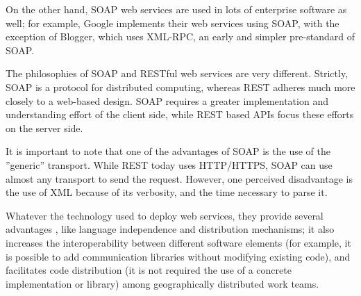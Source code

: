 \documentclass[final,1p,times]{elsarticle}
\begin{document}
On the other hand, SOAP web services are used in lots of enterprise software as well; for example, Google implements their web services using SOAP, with the exception of Blogger, which uses XML-RPC, an early and simpler pre-standard of SOAP. 

The philosophies of SOAP and RESTful web services are very different. Strictly, SOAP is a protocol for distributed computing, whereas REST adheres much more closely to a web-based design. 
SOAP requires a greater implementation and understanding effort of the client side, while REST based APIs focus these efforts on the server side. 


It is important to note that one of the advantages of SOAP is the use of the ''generic'' transport. While REST today uses HTTP/HTTPS, SOAP can use almost any transport to send the request. 
However, one perceived disadvantage is the use of XML \cite{LearningXML} because of its verbosity, and the time necessary to parse it.

Whatever the technology used to deploy web services, they provide several advantages \cite{GENERICITY05}, like language independence and distribution mechanisms; 
it also increases the interoperability between different software elements (for example, it is possible to add communication libraries without modifying existing code), and facilitates code distribution (it is not required the use of a concrete implementation or library) among geographically distributed work teams.

\end{document}

